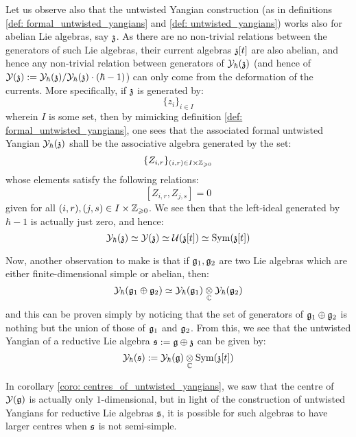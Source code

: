         Let us observe also that the untwisted Yangian construction (as in definitions \ref{def: formal_untwisted_yangians} and \ref{def: untwisted_yangians}) works also for abelian Lie algebras, say $\mathfrak{z}$. As there are no non-trivial relations between the generators of such Lie algebras, their current algebras $\mathfrak{z}[t]$ are also abelian, and hence any non-trivial relation between generators of $\mathcal{Y}_{\hbar}(\mathfrak{z})$ (and hence of $\mathcal{Y}(\mathfrak{z}) := \mathcal{Y}_{\hbar}(\mathfrak{z})/\mathcal{Y}_{\hbar}(\mathfrak{z}) \cdot (\hbar - 1)$) can only come from the deformation of the currents. More specifically, if $\mathfrak{z}$ is generated by:
            $$\{z_i\}_{i \in I}$$
        wherein $I$ is some set, then by mimicking definition \ref{def: formal_untwisted_yangians}, one sees that the associated formal untwisted Yangian $\mathcal{Y}_{\hbar}(\mathfrak{z})$ shall be the associative algebra generated by the set:
            $$\{Z_{i, r}\}_{(i, r) \in I \x \Z_{\geq 0}}$$
        whose elements satisfy the following relations:
            $$[ Z_{i, r}, Z_{j, s} ] = 0$$
        given for all $(i, r), (j, s) \in I \x \Z_{\geq 0}$. We see then that the left-ideal generated by $\hbar - 1$ is actually just zero, and hence:
            $$\mathcal{Y}_{\hbar}(\mathfrak{z}) \simeq \mathcal{Y}(\mathfrak{z}) \simeq \mathcal{U}(\mathfrak{z}[t]) \simeq \mathrm{Sym}(\mathfrak{z}[t])$$

        Now, another observation to make is that if $\mathfrak{g}_1, \mathfrak{g}_2$ are two Lie algebras which are either finite-dimensional simple or abelian, then:
            $$\calY_{\hbar}(\g_1 \oplus \g_2) \cong \calY_{\hbar}(\g_1) \tensor_{\bbC} \calY_{\hbar}(\g_2)$$
        and this can be proven simply by noticing that the set of generators of $\mathfrak{g}_1 \oplus \mathfrak{g}_2$ is nothing but the union of those of $\mathfrak{g}_1$ and $\mathfrak{g}_2$. From this, we see that the untwisted Yangian of a reductive Lie algebra $\mathfrak{s} := \mathfrak{g} \oplus \mathfrak{z}$ can be given by:
            $$\calY_{\hbar}(\s) := \calY_{\hbar}(\g) \tensor_{\bbC} \Sym(\z[t])$$

        In corollary \ref{coro: centres_of_untwisted_yangians}, we saw that the centre of $\mathcal{Y}(\mathfrak{g})$ is actually only $1$-dimensional, but in light of the construction of untwisted Yangians for reductive Lie algebras $\mathfrak{s}$, it is possible for such algebras to have larger centres when $\mathfrak{s}$ is not semi-simple.

